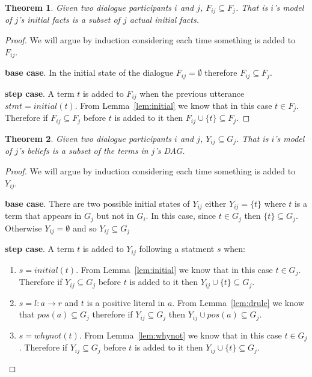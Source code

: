 \documentclass{blue-book}
\newtheorem{theorem}{Theorem}
\newcommand{\drule}[3]{\ensuremath{#1:#2 \rightarrow #3}}
\begin{document}
\begin{theorem}
Given two dialogue participants $i$ and $j$, $F_{ij} \subseteq F_j$.  That is $i$'s model of $j$'s initial facts is a subset of $j$ actual initial facts.
\end{theorem}
\begin{proof}
We will argue by induction considering each time something is added to $F_{ij}$.

{\bf base case}.  In the initial state of the dialogue $F_{ij} = \emptyset$ therefore $F_{ij} \subseteq F_j$.

{\bf step case}.  A term $t$ is added to $F_{ij}$ when the previous utterance $stmt = initial(t)$.  From Lemma~\ref{lem:initial} we know that in this case $t \in F_j$.  Therefore if $F_{ij} \subseteq F_{j}$ before $t$ is added to it then $F_{ij} \cup \{t\} \subseteq F_{j}$.

\end{proof}
\begin{theorem}
\label{thm:Ycorrect}
Given two dialogue participants $i$ and $j$, $Y_{ij} \subseteq G_j$.  That is $i$'s model of $j$'s beliefs is a subset of the terms in $j$'s DAG.
\end{theorem}
\begin{proof}
We will argue by induction considering each time something is added to $Y_{ij}$.

{\bf base case}.  There are two possible initial states of $Y_{ij}$ either $Y_{ij} = \{t\}$ where $t$ is a term that appears in $G_j$ but not in $G_i$.  In this case, since $t \in G_j$ then $\{t\} \subseteq G_j$.  Otherwise $Y_{ij} = \emptyset$ and so $Y_{ij} \subseteq G_j$

{\bf step case}.  A term $t$ is added to $Y_{ij}$ following a statment $s$ when:
\begin{enumerate}
\item  $s = initial(t)$.  From Lemma~\ref{lem:initial} we know that in this case $t \in G_j$.  Therefore if $Y_{ij} \subseteq G_{j}$ before $t$ is added to it then $Y_{ij} \cup \{t\} \subseteq G_{j}$.
\item $s = \drule{l}{a}{r}$ and $t$ is a positive literal in $a$.  From Lemma~\ref{lem:drule} we know that $pos(a) \subseteq G_{j}$ therefore if $Y_{ij} \subseteq G_{j}$ then $Y_{ij} \cup pos(a) \subseteq G_{j}$.
\item $s = whynot(t)$.  From Lemma~\ref{lem:whynot} we  know that in this case $t \in G_j$.  Therefore if $Y_{ij} \subseteq G_{j}$ before $t$ is added to it then $Y_{ij} \cup \{t\} \subseteq G_{j}$.
\end{enumerate}
\end{proof}
\end{document}
